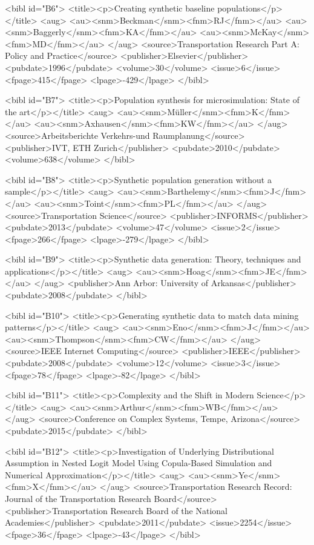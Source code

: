 \documentclass{article}
\begin{document}
{<bibl id="B6">
  <title><p>Creating synthetic baseline populations</p></title>
  <aug>
    <au><snm>Beckman</snm><fnm>RJ</fnm></au>
    <au><snm>Baggerly</snm><fnm>KA</fnm></au>
    <au><snm>McKay</snm><fnm>MD</fnm></au>
  </aug>
  <source>Transportation Research Part A: Policy and Practice</source>
  <publisher>Elsevier</publisher>
  <pubdate>1996</pubdate>
  <volume>30</volume>
  <issue>6</issue>
  <fpage>415</fpage>
  <lpage>-429</lpage>
</bibl>

<bibl id="B7">
  <title><p>Population synthesis for microsimulation: State of the
  art</p></title>
  <aug>
    <au><snm>M{\"u}ller</snm><fnm>K</fnm></au>
    <au><snm>Axhausen</snm><fnm>KW</fnm></au>
  </aug>
  <source>Arbeitsberichte Verkehrs-und Raumplanung</source>
  <publisher>IVT, ETH Zurich</publisher>
  <pubdate>2010</pubdate>
  <volume>638</volume>
</bibl>

<bibl id="B8">
  <title><p>Synthetic population generation without a sample</p></title>
  <aug>
    <au><snm>Barthelemy</snm><fnm>J</fnm></au>
    <au><snm>Toint</snm><fnm>PL</fnm></au>
  </aug>
  <source>Transportation Science</source>
  <publisher>INFORMS</publisher>
  <pubdate>2013</pubdate>
  <volume>47</volume>
  <issue>2</issue>
  <fpage>266</fpage>
  <lpage>-279</lpage>
</bibl>

<bibl id="B9">
  <title><p>Synthetic data generation: Theory, techniques and
  applications</p></title>
  <aug>
    <au><snm>Hoag</snm><fnm>JE</fnm></au>
  </aug>
  <publisher>Ann Arbor: University of Arkansas</publisher>
  <pubdate>2008</pubdate>
</bibl>

<bibl id="B10">
  <title><p>Generating synthetic data to match data mining patterns</p></title>
  <aug>
    <au><snm>Eno</snm><fnm>J</fnm></au>
    <au><snm>Thompson</snm><fnm>CW</fnm></au>
  </aug>
  <source>IEEE Internet Computing</source>
  <publisher>IEEE</publisher>
  <pubdate>2008</pubdate>
  <volume>12</volume>
  <issue>3</issue>
  <fpage>78</fpage>
  <lpage>-82</lpage>
</bibl>

<bibl id="B11">
  <title><p>Complexity and the Shift in Modern Science</p></title>
  <aug>
    <au><snm>Arthur</snm><fnm>WB</fnm></au>
  </aug>
  <source>Conference on Complex Systems, Tempe, Arizona</source>
  <pubdate>2015</pubdate>
</bibl>

<bibl id="B12">
  <title><p>Investigation of Underlying Distributional Assumption in Nested
  Logit Model Using Copula-Based Simulation and Numerical
  Approximation</p></title>
  <aug>
    <au><snm>Ye</snm><fnm>X</fnm></au>
  </aug>
  <source>Transportation Research Record: Journal of the Transportation
  Research Board</source>
  <publisher>Transportation Research Board of the National
  Academies</publisher>
  <pubdate>2011</pubdate>
  <issue>2254</issue>
  <fpage>36</fpage>
  <lpage>-43</lpage>
</bibl>

}
\end{document}
